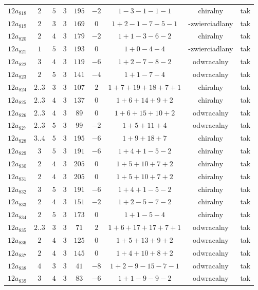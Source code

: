 \begin{longtable}{ccccccccc}
$12a_{818}$ & $2$ & $5$ & $3$ & $195$ & $-2$ & $1-3-1-1-1$ & chiralny & tak \\
$12a_{819}$ & $2$ & $3$ & $3$ & $169$ & $0$ & $1+2-1-7-5-1$ & -zwierciadlany & tak \\
$12a_{820}$ & $2$ & $4$ & $3$ & $179$ & $-2$ & $1+1-3-6-2$ & chiralny & tak \\
$12a_{821}$ & $1$ & $5$ & $3$ & $193$ & $0$ & $1+0-4-4$ & -zwierciadlany & tak \\
$12a_{822}$ & $3$ & $4$ & $3$ & $119$ & $-6$ & $1+2-7-8-2$ & odwracalny & tak \\
$12a_{823}$ & $2$ & $5$ & $3$ & $141$ & $-4$ & $1+1-7-4$ & odwracalny & tak \\
$12a_{824}$ & $2..3$ & $3$ & $3$ & $107$ & $2$ & $1+7+19+18+7+1$ & chiralny & tak \\
$12a_{825}$ & $2..3$ & $4$ & $3$ & $137$ & $0$ & $1+6+14+9+2$ & chiralny & tak \\
$12a_{826}$ & $2..3$ & $4$ & $3$ & $89$ & $0$ & $1+6+15+10+2$ & odwracalny & tak \\
$12a_{827}$ & $2..3$ & $5$ & $3$ & $99$ & $-2$ & $1+5+11+4$ & odwracalny & tak \\
$12a_{828}$ & $3..4$ & $5$ & $3$ & $195$ & $-6$ & $1+9+18+7$ & chiralny & tak \\
$12a_{829}$ & $3$ & $5$ & $3$ & $191$ & $-6$ & $1+4+1-5-2$ & chiralny & tak \\
$12a_{830}$ & $2$ & $4$ & $3$ & $205$ & $0$ & $1+5+10+7+2$ & chiralny & tak \\
$12a_{831}$ & $2$ & $4$ & $3$ & $205$ & $0$ & $1+5+10+7+2$ & chiralny & tak \\
$12a_{832}$ & $3$ & $5$ & $3$ & $191$ & $-6$ & $1+4+1-5-2$ & chiralny & tak \\
$12a_{833}$ & $2$ & $4$ & $3$ & $151$ & $-2$ & $1+2-5-7-2$ & chiralny & tak \\
$12a_{834}$ & $2$ & $5$ & $3$ & $173$ & $0$ & $1+1-5-4$ & chiralny & tak \\
$12a_{835}$ & $2..3$ & $3$ & $3$ & $71$ & $2$ & $1+6+17+17+7+1$ & odwracalny & tak \\
$12a_{836}$ & $2$ & $4$ & $3$ & $125$ & $0$ & $1+5+13+9+2$ & odwracalny & tak \\
$12a_{837}$ & $2$ & $4$ & $3$ & $145$ & $0$ & $1+4+10+8+2$ & odwracalny & tak \\
$12a_{838}$ & $4$ & $3$ & $3$ & $41$ & $-8$ & $1+2-9-15-7-1$ & odwracalny & tak \\
$12a_{839}$ & $3$ & $4$ & $3$ & $83$ & $-6$ & $1+1-9-9-2$ & odwracalny & tak \\

\end{longtable}
